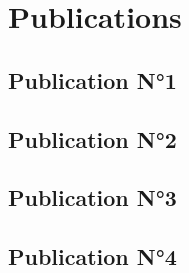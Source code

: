 \part{Publications}

\chapter{Publication N°1}
 
\cleardoublepage

\chapter{Publication N°2}
 
\cleardoublepage

\chapter{Publication N°3}
 
\cleardoublepage

\chapter{Publication N°4}
 
\cleardoublepage